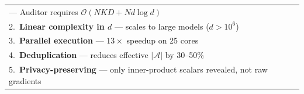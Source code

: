 \documentclass[10pt,journal,compsoc]{IEEEtran}
\begin{document}
\begin{table}[htbp]
\begin{tabular}{|l|l|l|l|}
{  --- Auditor requires $\mathcal{O}(NKD + Nd\log d)$} \\
\multicolumn{4}{|l|}{2.~\textbf{Linear complexity in $d$}
  --- scales to large models ($d > 10^6$)} \\
\multicolumn{4}{|l|}{3.~\textbf{Parallel execution}
  --- $13\times$ speedup on 25 cores} \\
\multicolumn{4}{|l|}{4.~\textbf{Deduplication}
  --- reduces effective $|\mathcal{A}|$ by 30--50\%} \\
\multicolumn{4}{|l|}{5.~\textbf{Privacy-preserving}
  --- only inner-product scalars revealed, not raw gradients} \\
\hline
\end{tabular}
\end{table}

\end{document}
